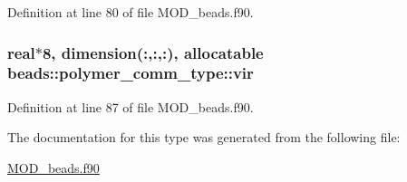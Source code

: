 Definition at line 80 of file M\-O\-D\-\_\-beads.\-f90.

\hypertarget{structbeads_1_1polymer__comm__type_abf9384adaf528e1723461dd50d2a42ae}{
\subsubsection[{vir}]{\setlength{\rightskip}{0pt plus 5cm}real$\ast$8, dimension(\-:,\-:,\-:), allocatable beads\-::polymer\-\_\-comm\-\_\-type\-::vir}}\label{structbeads_1_1polymer__comm__type_abf9384adaf528e1723461dd50d2a42ae}


Definition at line 87 of file M\-O\-D\-\_\-beads.\-f90.



The documentation for this type was generated from the following file\-:\begin{DoxyCompactItemize}
\item 
\hyperlink{MOD__beads_8f90}{M\-O\-D\-\_\-beads.\-f90}\end{DoxyCompactItemize}
